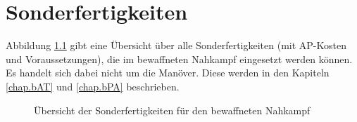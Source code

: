 %

\chapter{Sonderfertigkeiten}
Abbildung \ref{fig.bSF} gibt eine Übersicht über alle Sonderfertigkeiten (mit AP-Kosten und Voraussetzungen), die im bewaffneten Nahkampf eingesetzt werden können.
Es handelt sich dabei nicht um die Manöver.
Diese werden in den Kapiteln \ref{chap.bAT} und \ref{chap.bPA} beschrieben.

\begin{figure}
    \centering
    \caption{Übersicht der Sonderfertigkeiten für den bewaffneten Nahkampf}
    \label{fig.bSF}
\end{figure}

